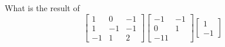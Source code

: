 \eexo
\solution{
\begin{equation*}
\left[
\begin{array}{c}
-3\\
-3
\end{array}
\right]
\end{equation*}
}
\bexo
What is the result of 
\begin{equation*}
\left[
\begin{array}{ccc}
1& 0& -1\\
1& -1& -1\\
-1& 1 &2
\end{array}
\right]
\left[
\begin{array}{cc}
-1& -1\\
0& 1\\
-1 1
\end{array}
\right]
\left[
\begin{array}{c}
1\\
-1
\end{array}
\right]
\end{equation*}
\eexo
\solution{
\begin{equation*}
\left[
\begin{array}{c}
2\\
3\\
-5
\end{array}
\right]
\end{equation*}
}


